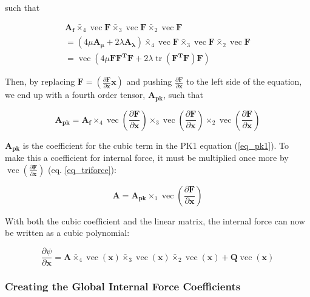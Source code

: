 \documentclass[twocolumn,10pt]{asme2ej}
\DeclareMathOperator{\vect}{vec}
\DeclareMathOperator{\tr}{tr}
\begin{document}
such that

\begin{multline}
    \bm{A_f} \bar{\times}_4 \vect \bm{F} \bar{\times}_3 \vect \bm{F}  \bar{\times}_2 \vect \bm{F}
    \\ = \left( 4\mu\bm{A_{\mu}} + 2\lambda\bm{A_{\lambda}}\right) \bar{\times}_4 \vect \bm{F} \bar{\times}_3 \vect \bm{F} \bar{\times}_2 \vect \bm{F}
    \\ = \vect \left( 4\mu\bm{FF^TF} + 2\lambda\tr\left(\bm{F^TF}\right)\bm{F}\right)
\end{multline}

Then, by replacing $\bm{F} = \left( \frac{\partial \bm{F}}{\partial \bm{x}} \bm{x}\right)$ and pushing $\frac{\partial \bm{F}}{\partial \bm{x}}$ to the left side of the equation, we end up with a fourth order tensor, $\bm{A_{pk}}$, such that

\begin{equation}
\bm{A_{pk}} = \bm{A_f} \times_4 \vect \left(\frac{\partial \bm{F}}{\partial \bm{x}} \right)
\times_3 \vect \left(\frac{\partial \bm{F}}{\partial \bm{x}} \right)
\times_2 \vect \left(\frac{\partial \bm{F}}{\partial \bm{x}} \right)
\end{equation}

$\bm{A_{pk}}$ is the coefficient for the cubic term in the PK1 equation (\ref{eq_pk1}). To make this a coefficient for internal force, it must be multiplied once more by $\vect \left(\frac{\partial \bm{F}}{\partial \bm{x}} \right)$ (eq. \ref{eq_triforce}):

\begin{equation}
\bm{A} = \bm{A_{pk}} \times_1 \vect \left(\frac{\partial \bm{F}}{\partial \bm{x}} \right)
\label{eq_cubicTerm}
\end{equation}

With both the cubic coefficient and the linear matrix, the internal force can now be written as a cubic polynomial:

\begin{equation}
\frac{\partial \psi}{\partial \bm{x}} = \bm{A} \bar{\times}_4 \vect (\bm{x}) \bar{\times}_3 \vect (\bm{x}) \bar{\times}_2 \vect (\bm{x})+ \bm{Q}\vect (\bm{x})
\label{eq_unreducedCubic}
\end{equation}

\subsubsection{Creating the Global Internal Force Coefficients}
\end{document}
